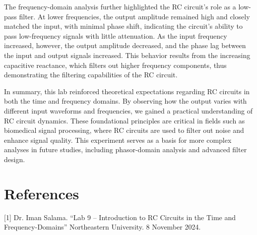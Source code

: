 \documentclass[12pt]{article}
\begin{document}
The frequency-domain analysis further highlighted the RC circuit’s role as a low-pass filter. At lower frequencies, the output amplitude remained high and closely matched the input, with minimal phase shift, indicating the circuit’s ability to pass low-frequency signals with little attenuation. As the input frequency increased, however, the output amplitude decreased, and the phase lag between the input and output signals increased. This behavior results from the increasing capacitive reactance, which filters out higher frequency components, thus demonstrating the filtering capabilities of the RC circuit.
\newline

In summary, this lab reinforced theoretical expectations regarding RC circuits in both the time and frequency domains. By observing how the output varies with different input waveforms and frequencies, we gained a practical understanding of RC circuit dynamics. These foundational principles are critical in fields such as biomedical signal processing, where RC circuits are used to filter out noise and enhance signal quality. This experiment serves as a basis for more complex analyses in future studies, including phasor-domain analysis and advanced filter design.


\section{References}
 [1] Dr. Iman Salama. “Lab 9 – Introduction to RC Circuits in the Time and Frequency-Domains” Northeastern University. 8 November 2024.
\end{document}
